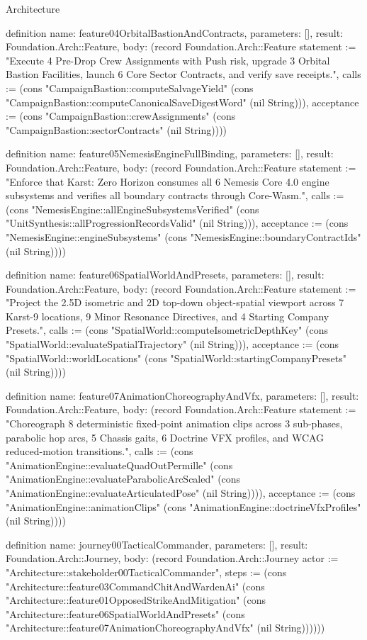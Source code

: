 \begin{lexlean}{Architecture}
\begin{semanticmodule}
definition{
  name: feature04OrbitalBastionAndContracts,
  parameters: [],
  result: Foundation.Arch::Feature,
  body: (record Foundation.Arch::Feature {statement := "Execute 4 Pre-Drop Crew Assignments with Push risk, upgrade 3 Orbital Bastion Facilities, launch 6 Core Sector Contracts, and verify save receipts.", calls := (cons "CampaignBastion::computeSalvageYield" (cons "CampaignBastion::computeCanonicalSaveDigestWord" (nil String))), acceptance := (cons "CampaignBastion::crewAssignments" (cons "CampaignBastion::sectorContracts" (nil String)))})
}

definition{
  name: feature05NemesisEngineFullBinding,
  parameters: [],
  result: Foundation.Arch::Feature,
  body: (record Foundation.Arch::Feature {statement := "Enforce that Karst: Zero Horizon consumes all 6 Nemesis Core 4.0 engine subsystems and verifies all boundary contracts through Core-Wasm.", calls := (cons "NemesisEngine::allEngineSubsystemsVerified" (cons "UnitSynthesis::allProgressionRecordsValid" (nil String))), acceptance := (cons "NemesisEngine::engineSubsystems" (cons "NemesisEngine::boundaryContractIds" (nil String)))})
}

definition{
  name: feature06SpatialWorldAndPresets,
  parameters: [],
  result: Foundation.Arch::Feature,
  body: (record Foundation.Arch::Feature {statement := "Project the 2.5D isometric and 2D top-down object-spatial viewport across 7 Karst-9 locations, 9 Minor Resonance Directives, and 4 Starting Company Presets.", calls := (cons "SpatialWorld::computeIsometricDepthKey" (cons "SpatialWorld::evaluateSpatialTrajectory" (nil String))), acceptance := (cons "SpatialWorld::worldLocations" (cons "SpatialWorld::startingCompanyPresets" (nil String)))})
}

definition{
  name: feature07AnimationChoreographyAndVfx,
  parameters: [],
  result: Foundation.Arch::Feature,
  body: (record Foundation.Arch::Feature {statement := "Choreograph 8 deterministic fixed-point animation clips across 3 sub-phases, parabolic hop arcs, 5 Chassis gaits, 6 Doctrine VFX profiles, and WCAG reduced-motion transitions.", calls := (cons "AnimationEngine::evaluateQuadOutPermille" (cons "AnimationEngine::evaluateParabolicArcScaled" (cons "AnimationEngine::evaluateArticulatedPose" (nil String)))), acceptance := (cons "AnimationEngine::animationClips" (cons "AnimationEngine::doctrineVfxProfiles" (nil String)))})
}

definition{
  name: journey00TacticalCommander,
  parameters: [],
  result: Foundation.Arch::Journey,
  body: (record Foundation.Arch::Journey {actor := "Architecture::stakeholder00TacticalCommander", steps := (cons "Architecture::feature03CommandChitAndWardenAi" (cons "Architecture::feature01OpposedStrikeAndMitigation" (cons "Architecture::feature06SpatialWorldAndPresets" (cons "Architecture::feature07AnimationChoreographyAndVfx" (nil String)))))})
}


\end{semanticmodule}
\end{lexlean}
